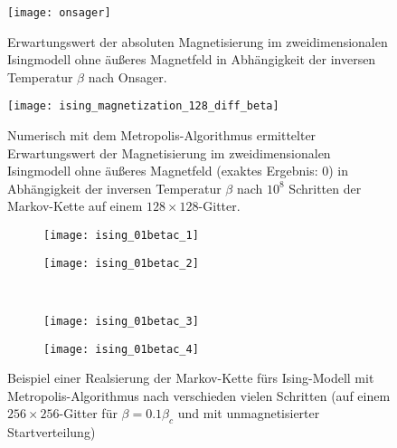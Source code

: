 \documentclass[twoside]{article}
\theoremstyle{definition}
\begin{document}
\begin{figure}
\centering
\texttt{[image: onsager]}
\caption{Erwartungswert der absoluten Magnetisierung im zweidimensionalen Isingmodell ohne äußeres Magnetfeld in Abhängigkeit der inversen Temperatur $\beta$ nach Onsager.}
\label{fig:onsager}
\end{figure}
\begin{figure}
\centering
\texttt{[image: ising\_magnetization\_128\_diff\_beta]}
\caption{Numerisch mit dem Metropolis-Algorithmus ermittelter Erwartungswert der Magnetisierung im zweidimensionalen Isingmodell ohne äußeres Magnetfeld (exaktes Ergebnis: 0) in Abhängigkeit der inversen Temperatur $\beta$ nach $10^8$ Schritten der Markov-Kette auf einem $128\times 128$-Gitter.}
\label{fig:isingmagn}
\end{figure}
\begin{figure}
\centering
	\begin{subfigure}[t]{0.49 \textwidth}
	\vskip 0pt
		\centering
		\texttt{[image: ising\_01betac\_1]}
		\caption{}
		\label{fig:ising_01betac_1}		
	\end{subfigure}
	\begin{subfigure}[t]{0.49 \textwidth}
	\vskip 0pt
		\centering
		\texttt{[image: ising\_01betac\_2]}
		\caption{}\label{fig:ising_01betac_2}
	\end{subfigure}\\
		\begin{subfigure}[t]{0.49 \textwidth}
	\vskip 0pt
		\centering
		\texttt{[image: ising\_01betac\_3]}
		\caption{}
		\label{fig:ising_01betac_3}		
	\end{subfigure}
	\begin{subfigure}[t]{0.49 \textwidth}
	\vskip 0pt
		\centering
		\texttt{[image: ising\_01betac\_4]}
		\caption{}	
	\label{fig:ising_01betac_4}
	\end{subfigure}
\caption{Beispiel einer Realsierung der Markov-Kette fürs Ising-Modell mit Metropolis-Algorithmus nach verschieden vielen Schritten (auf einem $256\times 256$-Gitter für $\beta=0.1 \beta_c$ und mit unmagnetisierter Startverteilung)}
\label{fig:ising01}
\end{figure}
\end{document}
